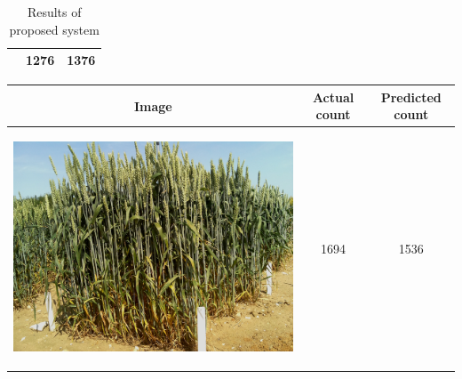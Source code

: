 \begin{table}[hp!]
\begin{tabular}{ | c | c | c | }
\begin{minipage}{.3\textwidth}
\begin{center}
      \end{center}
    \end{minipage}
    &
      1276
    & 
      1376
    \\ \hline
  \end{tabular}
  \caption{Results of proposed system}\label{tbl:myLboro}
\end{table}


\begin{table}[ht!]
  \centering
  \begin{tabular}{ | c | c | c | }
    \hline
    Image & Actual count & Predicted count \\ \hline
    \begin{minipage}{.3\textwidth}
      \begin{center}
		\includegraphics[width=\linewidth]{Images/008}
      \end{center}
    \end{minipage}
    &
      1694
    & 
      1536

\end{tabular}
\end{table}
